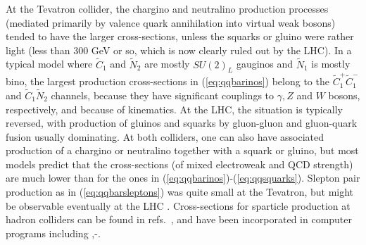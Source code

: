 \documentclass[11pt]{article}
\def\stilde{\widetilde}
\begin{document}
At the Tevatron collider, the chargino and neutralino production processes 
(mediated primarily by valence quark annihilation into virtual weak 
bosons) tended to have the larger cross-sections, unless the squarks or 
gluino were rather light (less than 300 GeV or so, which is now clearly 
ruled out by the LHC). In a typical model 
where $\stilde C_1$ and $\stilde N_2$ are mostly $SU(2)_L$ gauginos and 
$\stilde N_1$ is mostly bino, the largest production cross-sections in 
(\ref{eq:qqbarinos}) belong to the $\stilde C_1^+\stilde C_1^-$ and 
$\stilde C_1\stilde N_2$ channels, because they have significant couplings 
to $\gamma,Z$ and $W$ bosons, respectively, and because of kinematics. At 
the LHC, the situation is typically reversed, with production of gluinos 
and squarks by gluon-gluon and gluon-quark fusion usually dominating. At both 
colliders, one can also have associated production of a chargino or 
neutralino together with a squark or gluino, but most models 
predict that the 
cross-sections (of mixed electroweak and QCD strength) are much lower than 
for the ones in (\ref{eq:qqbarinos})-(\ref{eq:qqsquarks}). Slepton pair 
production as in (\ref{eq:qqbarsleptons}) was quite small at the 
Tevatron, but might be observable eventually at the LHC \cite{sleptonLHC}. 
Cross-sections for sparticle production at hadron colliders can be found 
in refs.~\cite{gluinosquarkproduction}, and have been incorporated in 
computer programs including 
\cite{ISAJET},\cite{PYTHIA}-\cite{Alwall:2011uj}.
\end{document}
